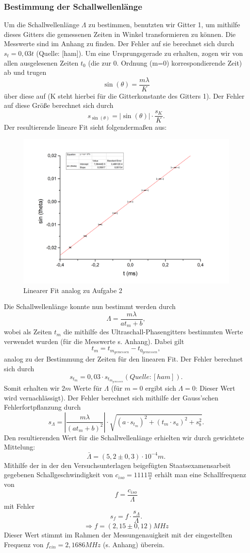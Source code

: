 \subsubsection{Bestimmung der Schallwellenlänge}
Um die Schallwellenlänge $\Lambda$ zu bestimmen, benutzten wir Gitter 1, um mithilfe dieses Gitters die gemessenen Zeiten in Winkel transformieren zu können. Die Messwerte sind im Anhang zu finden. Der Fehler auf sie berechnet sich durch $s_{t}=0,03t$ (Quelle: [ham]). Um eine Ursprungsgerade zu erhalten, zogen wir von allen ausgelesenen Zeiten $t_{0}$ (die zur 0. Ordnung (m=0) korrespondierende Zeit) ab und trugen \[\sin(\theta)=\frac{m\lambda}{K}\] über diese auf (K steht hierbei für die Gitterkonstante des Gitters 1). Der Fehler auf diese Größe berechnet sich durch \[s_{\sin(\theta)}=\left|\sin(\theta)\right|\cdot\frac{s_{K}}{K}.\] Der resultierende lineare Fit sieht folgendermaßen aus:\\
\begin{center}
\begin{figure}[htbp]
\includegraphics[scale=0.5]{Bilder/linfit}
\caption{Linearer Fit analog zu Aufgabe 2}
\end{figure}
\end{center}
Die Schallwellenlänge konnte nun bestimmt werden durch \[\Lambda=\frac{m\lambda}{at_{m}+b},\] wobei als Zeiten $t_{m}$ die mithilfe des Ultraschall-Phasengitters bestimmten Werte verwendet wurden (für die Messwerte s. Anhang). Dabei gilt \[t_{m}=t_{m_{gemessen}}-t_{0_{gemessen}},\] analog zu der Bestimmung der Zeiten für den linearen Fit. Der Fehler berechnet sich durch \[s_{t_{m}}=0,03\cdot s_{t_{m_{gemessen}}} (Quelle: [ham]).\] Somit erhalten wir $2m$ Werte für $\Lambda$ (für $m=0$ ergibt sich $\Lambda=0$: Dieser Wert wird vernachlässigt). Der Fehler berechnet sich mithilfe der Gauss'schen Fehlerfortpflanzung durch \[s_{\Lambda}=\left|\frac{m\lambda}{(at_{m}+b)^{2}}\right|\cdot\sqrt{(a\cdot s_{t_{m}})^{2}+(t_{m}\cdot s_{a})^{2}+s_{b}^{2}}.\] Den resultierenden Wert für die Schallwellenlänge erhielten wir durch gewichtete Mittelung: \[\bar{\Lambda}=(5,2\pm0,3)\cdot 10^{-4}m.\]Mithilfe der in der den Versuchsunterlagen beigefügten Staatsexamensarbeit gegebenen Schallgeschwindigkeit von $c_{iso}=1111 \frac{m}{s}$ erhält man eine Schallfrequenz von \[f=\frac{c_{iso}}{\Lambda}\] mit Fehler \[s_{f}=f\cdot\frac{s_{\Lambda}}{\Lambda}.\]
\[\Rightarrow f=(2,15\pm0,12)MHz\]
Dieser Wert stimmt im Rahmen der Messungenauigkeit mit der eingestellten Frequenz von $f_{ein}=2,1686MHz$ (s. Anhang) überein.